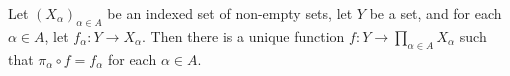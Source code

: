 Let $(X_{\alpha})_{\alpha \in A}$ be an indexed set of non-empty sets, let $Y$ be a set, and for each $\alpha \in A$, let $f_{\alpha}: Y \to X_{\alpha}$. Then there is a unique function $f: Y \to \prod_{\alpha \in A} X_{\alpha}$ such that $\pi_{\alpha} \circ f = f_{\alpha}$ for each $\alpha \in A$.
